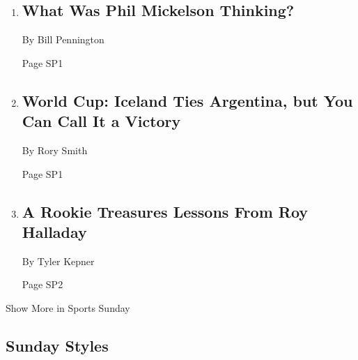 \begin{enumerate}
\def\labelenumi{\arabic{enumi}.}
\item
  \href{/2018/06/16/sports/golf/phil-mickelson-ball-us-open.html}{}

  \hypertarget{what-was-phil-mickelson-thinking-1}{%
  \subsection{What Was Phil Mickelson
  Thinking?}\label{what-was-phil-mickelson-thinking-1}}

  By Bill Pennington

  Page SP1
\item
  \href{/2018/06/16/sports/world-cup/argentina-iceland.html}{}

  \hypertarget{world-cup-iceland-ties-argentina-but-you-can-call-it-a-victory}{%
  \subsection{World Cup: Iceland Ties Argentina, but You Can Call It a
  Victory}\label{world-cup-iceland-ties-argentina-but-you-can-call-it-a-victory}}

  By Rory Smith

  Page SP1
\item
  \href{/2018/06/16/sports/baseball/jesse-biddle-braves-phillies-roy-halladay.html}{}

  \hypertarget{a-rookie-treasures-lessons-from-roy-halladay}{%
  \subsection{A Rookie Treasures Lessons From Roy
  Halladay}\label{a-rookie-treasures-lessons-from-roy-halladay}}

  By Tyler Kepner

  Page SP2
\end{enumerate}

Show More in Sports Sunday

\hypertarget{sunday-styles}{%
\subsection{Sunday Styles}\label{sunday-styles}}

